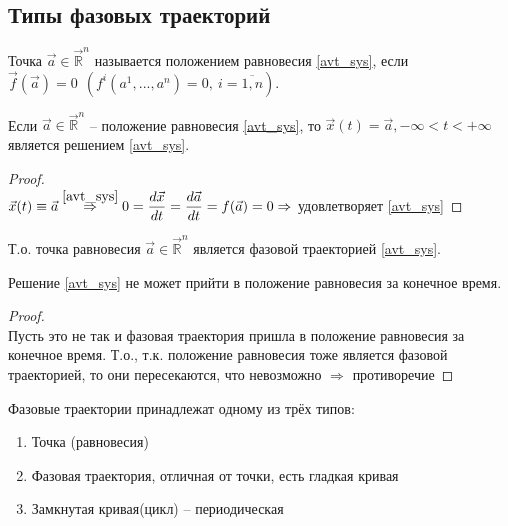 \subsection{Типы фазовых траекторий}

\begin{definition}
	Точка $\vec{a} \in \vec{\mathbb{R}}^n$ называется положением равновесия \eqref{avt_sys}, если \\ $ \vec{f}(\vec{a}) = 0 \ \ (f^i(a^1, ..., a^n) = 0, \ i = \overline{1, n} )$.
\end{definition}

\begin{proposition}
	Если $ \vec{a} \in \vec{\mathbb{R}}^n $ -- положение равновесия \eqref{avt_sys}, то $ \vec{x}(t) = \vec{a}, -\infty < t < + \infty$ является решением \eqref{avt_sys}.
\end{proposition}

\begin{proof}
	\ \\
	$\vec{x}(t) \equiv \vec{a} \overset{\eqref{avt_sys}}{\Rightarrow} 0 = \dfrac{d\vec{x}}{dt} = \dfrac{d \vec{a}}{dt} = f(\vec{a}) = 0 \Rightarrow$ удовлетворяет \eqref{avt_sys}
\end{proof}
\noindent Т.о. точка равновесия $ \vec{a} \in \vec{\mathbb{R}}^n$ является фазовой траекторией \eqref{avt_sys}.

\begin{corollary}
	Решение \eqref{avt_sys} не может прийти в положение равновесия за конечное время.
\end{corollary}

\begin{proof}
	\ \\
	Пусть это не так и фазовая траектория пришла в положение равновесия за конечное время. Т.о., т.к. положение равновесия тоже является фазовой траекторией, то они пересекаются, что невозможно $\Rightarrow$ противоречие 
\end{proof}

\begin{theorem}
	Фазовые траектории принадлежат одному из трёх типов:
	\begin{enumerate}
		\item Точка (равновесия)
		\item Фазовая траектория, отличная от точки, есть гладкая кривая
		\item Замкнутая кривая(цикл) -- периодическая
	\end{enumerate}
\end{theorem}
